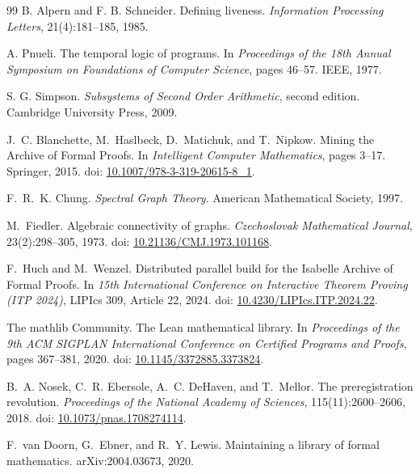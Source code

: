 \documentclass[11pt]{article}
\theoremstyle{plain}
\theoremstyle{definition}
\theoremstyle{remark}
\begin{document}
\begin{thebibliography}{99}
B. Alpern and F. B. Schneider.
\newblock Defining liveness.
\newblock \emph{Information Processing Letters}, 21(4):181--185, 1985.

A. Pnueli.
\newblock The temporal logic of programs.
\newblock In \emph{Proceedings of the 18th Annual Symposium on Foundations of
Computer Science}, pages 46--57. IEEE, 1977.

S. G. Simpson.
\newblock \emph{Subsystems of Second Order Arithmetic}, second edition.
\newblock Cambridge University Press, 2009.

J.~C. Blanchette, M.~Haslbeck, D.~Matichuk, and T.~Nipkow.
\newblock Mining the Archive of Formal Proofs.
\newblock In \emph{Intelligent Computer Mathematics}, pages 3--17. Springer, 2015.
\newblock doi: \href{https://doi.org/10.1007/978-3-319-20615-8_1}{10.1007/978-3-319-20615-8\_1}.

F.~R.~K. Chung.
\newblock \emph{Spectral Graph Theory}.
\newblock American Mathematical Society, 1997.

M.~Fiedler.
\newblock Algebraic connectivity of graphs.
\newblock \emph{Czechoslovak Mathematical Journal}, 23(2):298--305, 1973.
\newblock doi: \href{https://doi.org/10.21136/CMJ.1973.101168}{10.21136/CMJ.1973.101168}.

F.~Huch and M.~Wenzel.
\newblock Distributed parallel build for the Isabelle Archive of Formal Proofs.
\newblock In \emph{15th International Conference on Interactive Theorem Proving (ITP 2024)},
LIPIcs 309, Article 22, 2024.
\newblock doi: \href{https://doi.org/10.4230/LIPIcs.ITP.2024.22}{10.4230/LIPIcs.ITP.2024.22}.

The mathlib Community.
\newblock The Lean mathematical library.
\newblock In \emph{Proceedings of the 9th ACM SIGPLAN International Conference on Certified Programs and Proofs},
pages 367--381, 2020.
\newblock doi: \href{https://doi.org/10.1145/3372885.3373824}{10.1145/3372885.3373824}.

B.~A. Nosek, C.~R. Ebersole, A.~C. DeHaven, and T.~Mellor.
\newblock The preregistration revolution.
\newblock \emph{Proceedings of the National Academy of Sciences}, 115(11):2600--2606, 2018.
\newblock doi: \href{https://doi.org/10.1073/pnas.1708274114}{10.1073/pnas.1708274114}.

F.~van Doorn, G.~Ebner, and R.~Y. Lewis.
\newblock Maintaining a library of formal mathematics.
\newblock arXiv:2004.03673, 2020.


\end{thebibliography}
\end{document}

